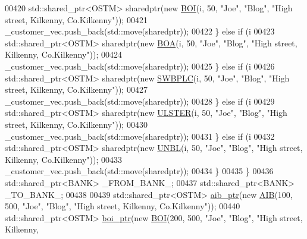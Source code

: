 \begin{DoxyCode}
00420             std::shared\_ptr<OSTM> sharedptr(\textcolor{keyword}{new} \hyperlink{class_b_o_i}{BOI}(i, 50, \textcolor{stringliteral}{"Joe"}, \textcolor{stringliteral}{"Blog"}, \textcolor{stringliteral}{"High street, Kilkenny,
       Co.Kilkenny"}));
00421             \_customer\_vec.push\_back(std::move(sharedptr));
00422         \} \textcolor{keywordflow}{else} \textcolor{keywordflow}{if} (i %
00423             std::shared\_ptr<OSTM> sharedptr(\textcolor{keyword}{new} \hyperlink{class_b_o_a}{BOA}(i, 50, \textcolor{stringliteral}{"Joe"}, \textcolor{stringliteral}{"Blog"}, \textcolor{stringliteral}{"High street, Kilkenny,
       Co.Kilkenny"}));
00424             \_customer\_vec.push\_back(std::move(sharedptr));
00425         \} \textcolor{keywordflow}{else} \textcolor{keywordflow}{if} (i %
00426             std::shared\_ptr<OSTM> sharedptr(\textcolor{keyword}{new} \hyperlink{class_s_w_b_p_l_c}{SWBPLC}(i, 50, \textcolor{stringliteral}{"Joe"}, \textcolor{stringliteral}{"Blog"}, \textcolor{stringliteral}{"High street, Kilkenny,
       Co.Kilkenny"}));
00427             \_customer\_vec.push\_back(std::move(sharedptr));
00428         \} \textcolor{keywordflow}{else} \textcolor{keywordflow}{if} (i %
00429             std::shared\_ptr<OSTM> sharedptr(\textcolor{keyword}{new} \hyperlink{class_u_l_s_t_e_r}{ULSTER}(i, 50, \textcolor{stringliteral}{"Joe"}, \textcolor{stringliteral}{"Blog"}, \textcolor{stringliteral}{"High street, Kilkenny,
       Co.Kilkenny"}));
00430             \_customer\_vec.push\_back(std::move(sharedptr));
00431         \} \textcolor{keywordflow}{else} \textcolor{keywordflow}{if} (i %
00432             std::shared\_ptr<OSTM> sharedptr(\textcolor{keyword}{new} \hyperlink{class_u_n_b_l}{UNBL}(i, 50, \textcolor{stringliteral}{"Joe"}, \textcolor{stringliteral}{"Blog"}, \textcolor{stringliteral}{"High street, Kilkenny,
       Co.Kilkenny"}));
00433             \_customer\_vec.push\_back(std::move(sharedptr));
00434         \}
00435     \}
00436     std::shared\_ptr<BANK> \_FROM\_BANK\_;
00437     std::shared\_ptr<BANK> \_TO\_BANK\_;
00438     
00439     std::shared\_ptr<OSTM> \hyperlink{class_my_test_c_ase_adad50e8278b64aa0321000b528e5362c_adad50e8278b64aa0321000b528e5362c}{aib\_ptr}(\textcolor{keyword}{new} \hyperlink{class_a_i_b}{AIB}(100, 500, \textcolor{stringliteral}{"Joe"}, \textcolor{stringliteral}{"Blog"}, \textcolor{stringliteral}{"High street, Kilkenny,
       Co.Kilkenny"}));
00440     std::shared\_ptr<OSTM> \hyperlink{class_my_test_c_ase_a5554de9e3e6393a89c66c036c529720b_a5554de9e3e6393a89c66c036c529720b}{boi\_ptr}(\textcolor{keyword}{new} \hyperlink{class_b_o_i}{BOI}(200, 500, \textcolor{stringliteral}{"Joe"}, \textcolor{stringliteral}{"Blog"}, \textcolor{stringliteral}{"High street, Kilkenny,
}
\end{DoxyCode}
